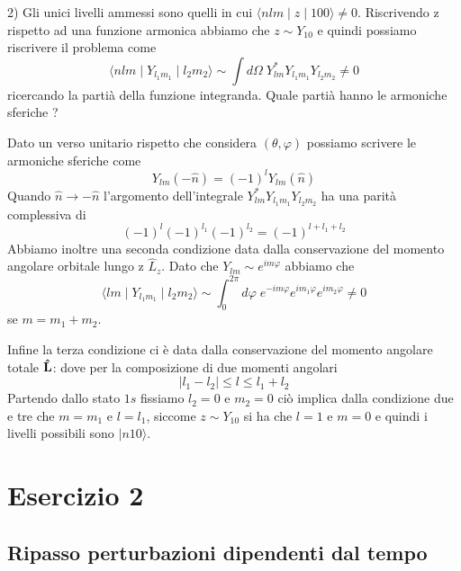 2) Gli unici livelli ammessi sono quelli in cui $\langle nlm \mid z \mid 100 \rangle \neq 0$. Riscrivendo z rispetto ad una funzione armonica abbiamo che $z \sim Y_{10}$ e quindi possiamo riscrivere il problema come 
\begin{equation*}
	\langle nlm \mid Y_{l_1m_1} \mid l_2m_2 \rangle \sim \int d\Omega \; Y_{lm}^*Y_{l_1m_1}Y_{l_2m_2} \neq 0
\end{equation*}
ricercando la parti\`a della funzione integranda. Quale parti\`a hanno le armoniche sferiche ?

Dato un verso unitario rispetto che considera $(\theta,\varphi)$ possiamo scrivere le armoniche sferiche come 
\begin{equation*}
	Y_{lm}(-\hat{n}) = (-1)^lY_{lm}(\hat{n})
\end{equation*}
Quando $\hat{n} \to - \hat{n}$ l'argomento dell'integrale $ Y_{lm}^*Y_{l_1m_1}Y_{l_2m_2} $ ha una parit\`a complessiva di 
\begin{equation*}
	(-1)^{l}(-1)^{l_1}(-1)^{l_2} = (-1)^{l+l_1+l_2}
\end{equation*}
Abbiamo inoltre una seconda condizione data dalla conservazione del momento angolare orbitale lungo z $\hat{L}_z$. Dato che $Y_{lm} \sim e^{im\varphi}$ abbiamo che 
\begin{equation*}
	\langle lm \mid Y_{l_1m_1} \mid l_2m_2 \rangle \sim \int_0^{2\pi} d \varphi \; e^{-im\varphi}e^{im_1\varphi}e^{im_2 \varphi} \neq 0
\end{equation*}
se  $m = m_1 +m_2$. 

Infine la terza condizione ci \` e data dalla conservazione del momento angolare totale $\bold{\hat{L}}$: dove per la composizione di due momenti angolari
\begin{equation*}
	|l_1-l_2| \leq l \leq l_1 + l_2
\end{equation*}
Partendo dallo stato $1s$ fissiamo $l_2 = 0 $ e $m_2 = 0 $ ci\`o implica dalla condizione due e tre che $m = m_1$ e $l = l _1$, siccome $z \sim Y_{10}$ si ha che $l = 1$ e $m= 0$ e quindi i livelli possibili sono $|n10\rangle $. 

\section{Esercizio 2}

\subsection{Ripasso perturbazioni dipendenti dal tempo}

	